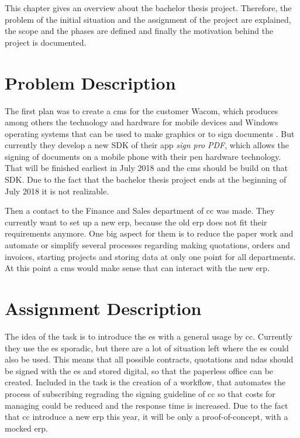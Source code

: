  This chapter gives an overview about the bachelor thesis project. Therefore, the problem of the initial situation and the assignment of the project are explained, the scope and the phases are defined and finally the motivation behind the project is documented.
 
 \section{Problem Description}
 The first plan was to create a \gls{cms} for the customer Wacom, which produces among others the technology and hardware for mobile devices and Windows operating systems that can be used to make graphics or to sign documents \parencite{wacom2018about}. But currently they develop a new \gls{SDK} of their \gls{app} \textit{sign pro PDF}, which allows the signing of documents on a mobile phone with their pen hardware technology\parencite{wacom2018sign}. That will be finished earliest in July 2018 and the \gls{cms} should be build on that \gls{SDK}. Due to the fact that the bachelor thesis project ends at the beginning of July 2018 it is not realizable.
 
 Then a contact to the Finance and Sales department of \gls{cc} was made. They currently want to set up a new \gls{erp}, because the old \gls{erp} does not fit their requirements anymore. One big aspect for them is to reduce the paper work and automate or simplify several processes regarding making quotations, orders and invoices, starting projects and storing data at only one point for all departments. At this point a \gls{cms} would make sense that can interact with the new \gls{erp}.

 \section{Assignment Description}
 The idea of the task is to introduce the \gls{es} with a general usage by \gls{cc}. Currently they use the \gls{es} sporadic, but there are a lot of situation left where the \gls{es} could also be used.
 This means that all possible contracts, quotations and \glspl{nda} should be signed with the \gls{es} and stored digital, so that the paperless office can be created. Included in the task is the creation of a workflow, that automates the process of subscribing regrading the signing guideline of \gls{cc} so that costs for managing could be reduced and the response time is increased. Due to the fact that \gls{cc} introduce a new \gls{erp} this year, it will be only a proof-of-concept, with a mocked \gls{erp}.
 

